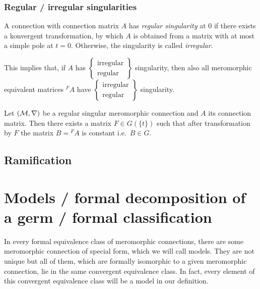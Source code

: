 \subsubsection{Regular / irregular singularities}
\begin{defn}
  A connection with connection matrix $A$ has \emph{regular singularity} at $0$
  if there exists a konvergent transformation, by which $A$ is obtained from a
  matrix with at most a simple pole at $t=0$.
  Otherwise, the singularity is called \emph{irregular}.
  \begin{s-rem}
    This implies that, if $A$ has
    $\left\{\substack{\text{irregular}\\\text{regular}}\right\}$
    singularity, then also all
    meromorphic equivalent matrices ${}^{F}\!A$ have
    $\left\{\substack{\text{irregular}\\\text{regular}}\right\}$
    singularity.
  \end{s-rem}
\end{defn}
\begin{thm}
  \begin{comment}
    see
    \begin{itemize}
      \item \cite[Thm.II.2.8]{sabbah2007isomonodromic}
      \item \cite[5.1.2]{hotta2008}
    \end{itemize}
  \end{comment}
  Let $(\mathcal{M},\nabla)$ be a regular singular meromorphic connection and $A$ its
  connection matrix.
  Then there exists a matrix $F\in G(\!\{t\}\!)$ such that after transformation
  by $F$ the matrix $B={}^F\!A$ is constant i.e.\ $B\in G$.
\end{thm}

\subsection{Ramification}
\begin{comment}
  \cite[I.5.4.1]{sabbah_cimpa90}
\end{comment}

\section{Models / formal decomposition of a germ / formal classification}
In every formal equivalence class of meromorphic connections, there are some
meromorphic connection of special form, which we will call models. They are not
unique but all of them, which are formally isomorphic to a given meromorphic
connection, lie in the same convergent equivalence class.
In fact, every element of this convergent equivalence class will be a model in
our definition.

